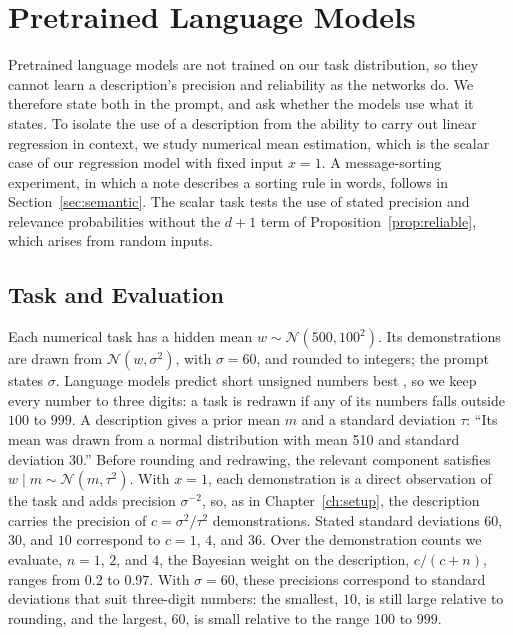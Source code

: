 \chapter{Pretrained Language Models}\label{ch:llm}

Pretrained language models are not trained on our task distribution, so they cannot learn a description's precision and reliability as the networks do. We therefore state both in the prompt, and ask whether the models use what it states. To isolate the use of a description from the ability to carry out linear regression in context, we study numerical mean estimation, which is the scalar case of our regression model with fixed input $x=1$. A message-sorting experiment, in which a note describes a sorting rule in words, follows in Section~\ref{sec:semantic}. The scalar task tests the use of stated precision and relevance probabilities without the $d+1$ term of Proposition~\ref{prop:reliable}, which arises from random inputs.

\section{Task and Evaluation}\label{sec:llm-task}

Each numerical task has a hidden mean $w\sim\mathcal{N}(500,100^2)$. Its demonstrations are drawn from $\mathcal{N}(w,\sigma^2)$, with $\sigma=60$, and rounded to integers; the prompt states $\sigma$. Language models predict short unsigned numbers best \citep{gruver2023,requeima2024}, so we keep every number to three digits: a task is redrawn if any of its numbers falls outside $100$ to $999$. A description gives a prior mean $m$ and a standard deviation $\tau$: ``Its mean was drawn from a normal distribution with mean 510 and standard deviation 30.'' Before rounding and redrawing, the relevant component satisfies $w\mid m\sim\mathcal{N}(m,\tau^2)$. With $x=1$, each demonstration is a direct observation of the task and adds precision $\sigma^{-2}$, so, as in Chapter~\ref{ch:setup}, the description carries the precision of $c=\sigma^2/\tau^2$ demonstrations. Stated standard deviations $60$, $30$, and $10$ correspond to $c=1$, $4$, and $36$. Over the demonstration counts we evaluate, $n=1$, $2$, and $4$, the Bayesian weight on the description, $c/(c+n)$, ranges from $0.2$ to $0.97$. With $\sigma=60$, these precisions correspond to standard deviations that suit three-digit numbers: the smallest, $10$, is still large relative to rounding, and the largest, $60$, is small relative to the range $100$ to $999$.

